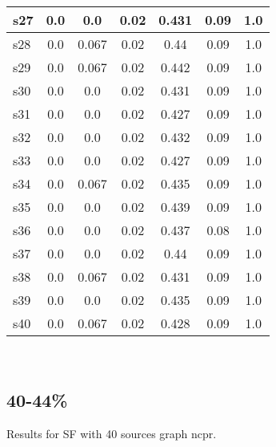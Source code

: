 \documentclass{article}
\begin{document}
\begin{tabular}{|l|c|c|c|c|c|c|}
\hline
s27 &0.0 & 0.0 & 0.02 & 0.431 & 0.09 & 1.0\\
\hline
s28 &0.0 & 0.067 & 0.02 & 0.44 & 0.09 & 1.0\\
\hline
s29 &0.0 & 0.067 & 0.02 & 0.442 & 0.09 & 1.0\\
\hline
s30 &0.0 & 0.0 & 0.02 & 0.431 & 0.09 & 1.0\\
\hline
s31 &0.0 & 0.0 & 0.02 & 0.427 & 0.09 & 1.0\\
\hline
s32 &0.0 & 0.0 & 0.02 & 0.432 & 0.09 & 1.0\\
\hline
s33 &0.0 & 0.0 & 0.02 & 0.427 & 0.09 & 1.0\\
\hline
s34 &0.0 & 0.067 & 0.02 & 0.435 & 0.09 & 1.0\\
\hline
s35 &0.0 & 0.0 & 0.02 & 0.439 & 0.09 & 1.0\\
\hline
s36 &0.0 & 0.0 & 0.02 & 0.437 & 0.08 & 1.0\\
\hline
s37 &0.0 & 0.0 & 0.02 & 0.44 & 0.09 & 1.0\\
\hline
s38 &0.0 & 0.067 & 0.02 & 0.431 & 0.09 & 1.0\\
\hline
s39 &0.0 & 0.0 & 0.02 & 0.435 & 0.09 & 1.0\\
\hline
s40 &0.0 & 0.067 & 0.02 & 0.428 & 0.09 & 1.0\\
\hline
\end{tabular}\\

\newpage

\subsection{40-44\%}

\noindent Results for SF with 40 sources graph ncpr.
\end{document}

